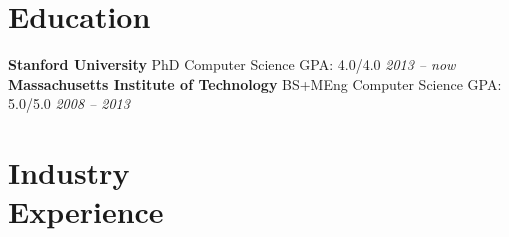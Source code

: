 \documentclass[margin,line]{resume}
\begin{document}
\begin{resume}

\section{\mysidestyle Education}

\textbf{Stanford University} \hspace{30.0mm} PhD \hspace{11.2mm} Computer Science \hspace{2.5mm} GPA: 4.0/4.0 \hfill \textsl{2013 -- now}\\
\textbf{Massachusetts Institute of Technology} \hspace{2.5mm} BS+MEng \hspace{2.5mm} Computer Science \hspace{2.5mm} GPA: 5.0/5.0 \hfill \textsl{2008 -- 2013}


\section{\mysidestyle Industry\\Experience}


\end{resume}
\end{document}
